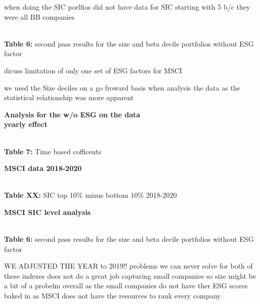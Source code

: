 

when doing the SIC porlfios did not have data for SIC starting with 5 b/c they were all BB companies 
 
 \begin{center}
    \paperspacingnarrow
    \\
    \textbf{Table 6:} second pass results for the size and beta decile portfolios without ESG factor\\
    \paperspacingwide
\end{center}

 
 dicuss limitation of only one set of ESG factors for MSCI 
 
 we used the Size deciles on a go froward basis when analysis the data as the statistical relationship was more apparent 
 
 \textbf{Analysis for the w/o ESG on the data}\\
 \textbf{yearly effect}\\
\begin{center}
    \paperspacingnarrow
    \\
    \textbf{Table 7:} Time based cofficents
    \paperspacingwide
\end{center}
 \textbf{MSCI data 2018-2020}\\
 \begin{center}
    \paperspacingnarrow
\\
\textbf{Table XX:} SIC top 10\% minus bottom 10\% 2018-2020
    \paperspacingwide
\end{center}
 \textbf{MSCI SIC level analysis}\\
 
  \begin{center}
    \paperspacingnarrow
    \\
    \textbf{Table 6:} second pass results for the size and beta decile portfolios without ESG factor\\
    \paperspacingwide
\end{center}

 WE ADJUSTED THE YEAR to 2019!!
 problems we can never solve for both of these indexes does not do a great job capturing small companies so size might be a bit of a probelm overall as the small companies do not have ther ESG scores baked in as MSCI does not have the resources to rank every company
